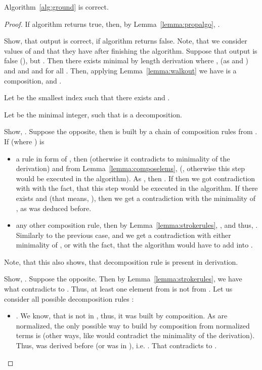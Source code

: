 \begin{prop}
 Algorithm~\ref{alg:ground} is correct.
\begin{proof}
	If algorithm returns true, then, by Lemma~\ref{lemma:propalgo}, .
	
	Show, that output is correct, if algorithm returns false. Note, that we consider values of  and  that they have after finishing the algorithm. Suppose that output is false (), but . Then there exists minimal by length derivation  where ,  (as  and ) and  and  and  for all .
	Then, applying Lemma~\ref{lemma:walkout} we have  is a composition, and .
	
	Let  be the smallest index such that there exists  and .
	
	Let  be the minimal integer, such that  is a decomposition.
	
	Show, . Suppose the opposite, then  is built by a chain of composition rules from . If  (where ) is
	\begin{itemize}
	 \item a rule in form of  , then  (otherwise it contradicts to minimality of the derivation) and from Lemma~\ref{lemma:composelems},  (, otherwise this step would be executed in the algorithm). As , then .
	If  then we got contradiction with with the fact, that this step would be executed in the algorithm. If there exists  and  (that means, ), then we get a contradiction with the minimality of , as  was deduced before.
	 \item any other composition rule, then by Lemma~\ref{lemma:strokerules}, , and thus, . Similarly to the previous case,  and we get a contradiction with either minimality of , or with the fact, that the algorithm would have to add  into .\end{itemize}
      
	Note, that this also shows, that decomposition rule is present in derivation.
	
	Show, . Suppose the opposite. Then by Lemma~\ref{lemma:strokerules}, we have  what contradicts to .
	Thus, at least one element from  is not from .
	Let us consider all possible decomposition rules :
	\begin{itemize}
		\item . We know, that  is not in , thus, it was built by composition. As  are normalized, the only possible way to build by composition  from normalized terms is  (other ways, like  would contradict the minimality of the derivation). 
		Thus,  was derived before (or was in ), i.e. . 
		That contradicts to .
		

\end{itemize}
\end{proof}
\end{prop}
